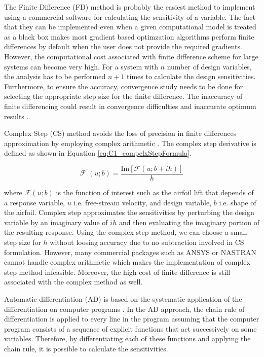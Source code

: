 The Finite Difference (FD) method is probably the easiest method to implement using a commercial software for calculating the sensitivity of a variable. The fact that they can be implemented even when a given computational model is treated as a black box makes most gradient based optimzation algorithms perform finite differences by default when the user does not provide the required gradients. However, the computational cost associated with finite difference scheme for large systems can become very high. For a system with $n$ number of design variables, the analysis has to be performed $n+1$ times to calculate the design sensitivities. Furthermore, to ensure the accuracy, convergence study needs to be done for selecting the appropriate step size for the finite difference. The inaccuracy of finite differencing could result in convergence difficulties and inaccurate optimum results \cite{sobieszczanski1997multidisciplinary}.

Complex Step (CS) method avoids the loss of precision in finite differences approximation by employing complex arithmetic \cite{martins2003complex}. The complex step derivative is defined as shown in Equation \eqref{eq:C1_compelxStepFormula}.

\begin{equation}\label{eq:C1_compelxStepFormula}
	\mathcal{F}^\prime\left(u; b\right) = \frac{\text{Im}\left[ \mathcal{F}\left(u; b + ih\right) \right]}{h}
\end{equation}

where $\mathcal{F}\left(u; b\right)$ is the function of interest such as the airfoil lift that depends of a response variable, $u$ i.e. free-stream velocity, and design variable, $b$ i.e. shape of the airfoil. Complex step approximates the sensitivities by perturbing the design variable by an imaginary value of $ih$ and then evaluating the imaginary portion of the resulting response. Using the complex step method, we can choose a small step size for $h$ without loosing accuracy due to no subtraction involved in CS formulation. However, many commercial packages such as ANSYS or NASTRAN cannot handle complex arithmetic which makes the implementation of complex step method infeasible. Moreover, the high cost of finite difference is still associated with the complex method as well.

Automatic differentiation (AD) is based on the systematic application of the differentiation on computer programs \cite{naumann2012art}. In the AD approach, the chain rule of differentiation is applied to every line in the program assuming that the computer program consists of a sequence of explicit functions that act successively on some variables. Therefore, by differentiating each of these functions and applying the chain rule, it is possible to calculate the sensitivities. 

